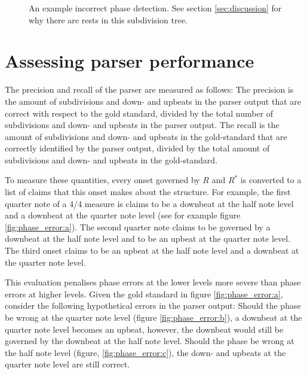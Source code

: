 \begin{figure}
\centering
{}
\caption{An example incorrect phase detection. See section \ref{sec:discussion} for why there are rests in this subdivision tree.}
\label{fig:phase_error}
\end{figure}

\section{Assessing parser performance}

The precision and recall of the parser are measured as follows: The precision is the amount of subdivisions and down- and upbeats in the parser output that are correct with respect to the gold standard, divided by the total number of subdivisions and down- and upbeats in the parser output. The recall is the amount of subdivisions and down- and upbeats in the gold-standard that are correctly identified by the parser output, divided by the total amount of subdivisions and down- and upbeats in the gold-standard.

To measure these quantities, every onset governed by $R$ and $R^*$ is converted to a list of claims that this onset makes about the structure. For example, the first quarter note of a 4/4 measure is claims to be a downbeat at the half note level and a downbeat at the quarter note level (see for example figure \ref{fig:phase_error:a}). The second quarter note claims to be governed by a downbeat at the half note level and to be an upbeat at the quarter note level. The third onset claims to be an upbeat at the half note level and a downbeat at the quarter note level. 

This evaluation penalises phase errors at the lower levels more severe than phase errors at higher levels. Given the gold standard in figure \ref{fig:phase_error:a}, consider the following hypothetical errors in the parser output: Should the phase be wrong at the quarter note level (figure \ref{fig:phase_error:b}), a downbeat at the quarter note level becomes  an upbeat, however, the downbeat would still be governed by the downbeat at the half note level. Should the phase be wrong at the half note level (figure, \ref{fig:phase_error:c}), the down- and upbeats at the quarter note level are still correct.

